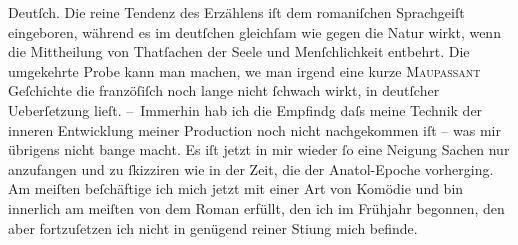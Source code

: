 \begin{ledgroupsized}[t]{13cm}
               Deutſch. Die reine Tendenz des Erzählens iſt dem romaniſchen Sprachgeiſt eingeboren,
               während es im deutſchen gleichſam wie gegen die Natur wirkt, wenn die Mittheilung von
               Thatſachen der Seele und Menſchlichkeit entbehrt. Die umgekehrte Probe kann man
               machen, we{\geminationn} man irgend eine kurze \textsc{Maupassant} Geſchichte die franzöſiſch noch lange nicht ſchwach wirkt, in deutſcher
               Ueberſetzung lieſt.\pend
           \pstart
           – Immerhin hab ich die Empfindg daſs {\pb}meine Technik der
               inneren Entwicklung meiner Production noch nicht nachgekommen iſt – was mir übrigens
               nicht bange macht. Es iſt jetzt in mir wieder ſo eine Neigung Sachen nur anzufangen
               und zu ſkizziren wie in der Zeit, die der Anatol-Epoche vorherging. Am meiſten beſchäftige ich mich jetzt mit einer Art
               von Komödie und bin innerlich
                   am meiſten von dem Roman erfüllt, den ich im Frühjahr begonnen, den aber fortzuſetzen ich nicht
               in genügend reiner Sti{\geminationm}ung mich befinde.\pend
           \pstart

\end{ledgroupsized}
